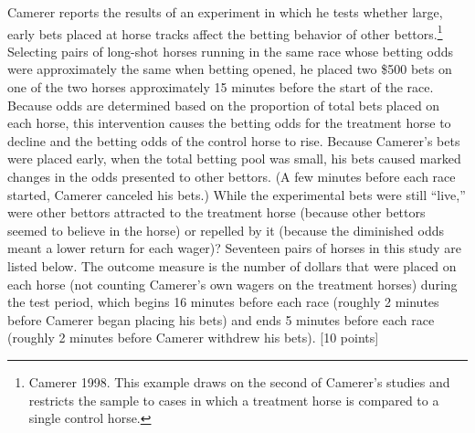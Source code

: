 \documentclass[11pt,notitlepage]{article}\usepackage[]{graphicx}\usepackage[]{color}
\begin{document}
Camerer reports the results of an experiment in which he tests whether large, early bets placed at horse tracks affect the betting behavior of other bettors.\footnote{Camerer 1998.  This example draws on the second of Camerer's studies and restricts the sample to cases in which a treatment horse is compared to a single control horse.} Selecting pairs of long-shot horses running in the same race whose betting odds were approximately the same when betting opened, he placed two \$500 bets on one of the two horses approximately 15 minutes before the start of the race. Because odds are determined based on the proportion of total bets placed on each horse, this intervention causes the betting odds for the treatment horse to decline and the betting odds of the control horse to rise. Because Camerer's bets were placed early, when the total betting pool was small, his bets caused marked changes in the odds presented to other bettors. (A few minutes before each race started, Camerer canceled his bets.) While the experimental bets were still ``live,'' were other bettors attracted to the treatment horse (because other bettors seemed to believe in the horse) or repelled by it (because the diminished odds meant a lower return for each wager)? Seventeen pairs of horses in this study are listed below. The outcome measure is the number of dollars that were placed on each horse (not counting Camerer's own wagers on the treatment horses) during the test period, which begins 16 minutes before each race (roughly 2 minutes before Camerer began placing his bets) and ends 5 minutes before each race (roughly 2 minutes before Camerer withdrew his bets). [10 points]
\end{document}
